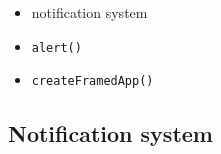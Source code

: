 \begin{itemize}
  \begin{itemize}
  \tightlist
  \item
    notification system
  \item
    \texttt{a\allowbreak{}l\allowbreak{}e\allowbreak{}r\allowbreak{}t\allowbreak{}(\allowbreak{})}
  \item
    \texttt{c\allowbreak{}r\allowbreak{}e\allowbreak{}a\allowbreak{}t\allowbreak{}e\allowbreak{}F\allowbreak{}r\allowbreak{}a\allowbreak{}m\allowbreak{}e\allowbreak{}d\allowbreak{}A\allowbreak{}p\allowbreak{}p\allowbreak{}(\allowbreak{})}
  \end{itemize}
\end{itemize}

\subsection{Notification system}\label{record-019-notification-system}

